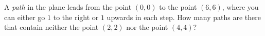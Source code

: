 A \emph{path} in the plane leads from the point $(0,0)$ to the point $(6,6)$,
where you can either go $1$ to the right or $1$ upwards in each step.
How many paths are there that contain neither the point $(2,2)$ nor the point $(4,4)$?

